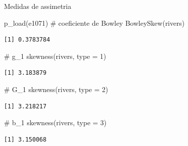 \documentclass[
  10pt,
  ignorenonframetext,
]{beamer}
\newenvironment{Shaded}{\begin{snugshade}}{\end{snugshade}}
\newcommand{\AttributeTok}[1]{\textcolor[rgb]{0.40,0.45,0.13}{#1}}
\newcommand{\CommentTok}[1]{\textcolor[rgb]{0.37,0.37,0.37}{#1}}
\newcommand{\DecValTok}[1]{\textcolor[rgb]{0.68,0.00,0.00}{#1}}
\newcommand{\FunctionTok}[1]{\textcolor[rgb]{0.28,0.35,0.67}{#1}}
\newcommand{\NormalTok}[1]{\textcolor[rgb]{0.00,0.23,0.31}{#1}}
\begin{document}
\begin{frame}[fragile]{Medidas de assimetria}
\protect\hypertarget{medidas-de-assimetria-1}{}
\begin{Shaded}
\begin{Highlighting}[]
\FunctionTok{p\_load}\NormalTok{(e1071)}
\CommentTok{\# coeficiente de Bowley}
\FunctionTok{BowleySkew}\NormalTok{(rivers)}
\end{Highlighting}
\end{Shaded}

\begin{verbatim}
[1] 0.3783784
\end{verbatim}

\begin{Shaded}
\begin{Highlighting}[]
\CommentTok{\# g\_1}
\FunctionTok{skewness}\NormalTok{(rivers, }\AttributeTok{type =} \DecValTok{1}\NormalTok{)}
\end{Highlighting}
\end{Shaded}

\begin{verbatim}
[1] 3.183879
\end{verbatim}

\begin{Shaded}
\begin{Highlighting}[]
\CommentTok{\# G\_1}
\FunctionTok{skewness}\NormalTok{(rivers, }\AttributeTok{type =} \DecValTok{2}\NormalTok{)}
\end{Highlighting}
\end{Shaded}

\begin{verbatim}
[1] 3.218217
\end{verbatim}

\begin{Shaded}
\begin{Highlighting}[]
\CommentTok{\# b\_1}
\FunctionTok{skewness}\NormalTok{(rivers, }\AttributeTok{type =} \DecValTok{3}\NormalTok{)}
\end{Highlighting}
\end{Shaded}

\begin{verbatim}
[1] 3.150068
\end{verbatim}
\end{frame}
\end{document}
